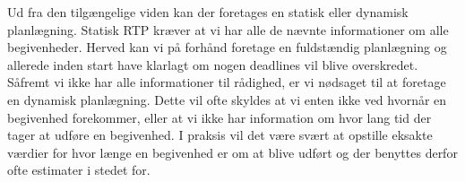 Ud fra den tilgængelige viden kan der foretages en statisk eller dynamisk planlægning\cite{cheng1987scheduling}. Statisk RTP kræver at vi har alle de nævnte informationer om alle begivenheder. Herved kan vi på forhånd foretage en fuldstændig planlægning og allerede inden start have klarlagt om nogen deadlines vil blive overskredet. Såfremt vi ikke har alle informationer til rådighed, er vi nødsaget til at foretage en dynamisk planlægning. Dette vil ofte skyldes at vi enten ikke ved hvornår en begivenhed forekommer, eller at vi ikke har information om hvor lang tid der tager at udføre en begivenhed. I praksis vil det være svært at opstille eksakte værdier for hvor længe en begivenhed er om at blive udført og der benyttes derfor ofte estimater i stedet for. 





